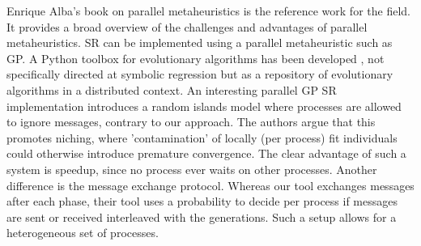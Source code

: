%
Enrique Alba's book \cite{parallelmetaheuristics} on parallel metaheuristics is the reference work for the field. It provides a broad overview of the challenges and advantages of parallel metaheuristics.  SR can be implemented using a parallel metaheuristic such as GP.
A Python toolbox for evolutionary algorithms has been developed \citep{DEAP}, not specifically directed at symbolic regression but as a repository of evolutionary algorithms in a distributed context.
An interesting parallel GP SR implementation \citep{DGPSR} introduces a random islands model where processes are allowed to ignore messages, contrary to our approach. The authors argue that this promotes niching, where 'contamination' of locally (per process) fit individuals could otherwise introduce premature convergence. The clear advantage of such a system is speedup, since no process ever waits on other processes. Another difference is the message exchange protocol. Whereas our tool exchanges messages after each phase, their tool uses a probability to decide per process if messages are sent or received interleaved with the generations. Such a setup allows for a heterogeneous set of processes.
